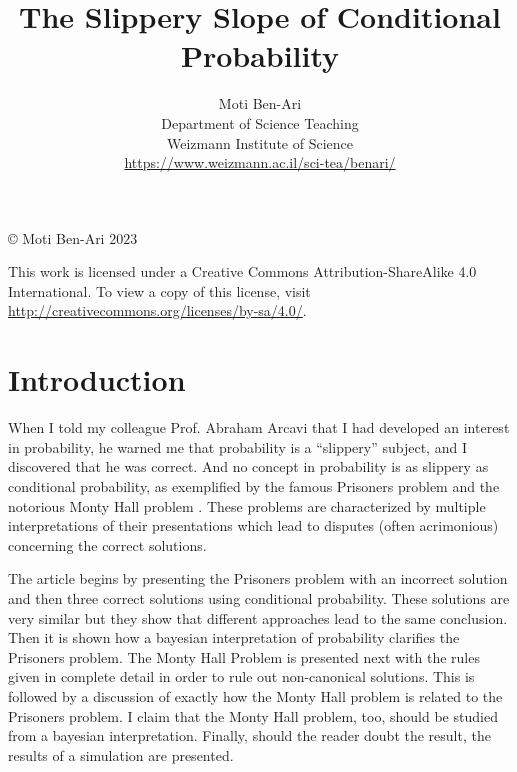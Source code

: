 \documentclass[11pt,a4paper]{article}
\begin{document}
\title{\textbf The Slippery Slope of Conditional Probability}

\author{Moti Ben-Ari\\
Department of Science Teaching\\
Weizmann Institute of Science\\
\url{https://www.weizmann.ac.il/sci-tea/benari/}}

\maketitle

\begin{center}
\footnotesize\copyright{} Moti Ben-Ari $2023$
\end{center}
\vspace*{-3ex}
\begin{footnotesize}
This work is licensed under a Creative Commons Attribution-ShareAlike 4.0 International. To view a copy of this license, visit \url{http://creativecommons.org/licenses/by-sa/4.0/}.
\end{footnotesize}


\section{Introduction}

When I told my colleague Prof. Abraham Arcavi that I had developed an interest in probability, he warned me that probability is a ``slippery'' subject, and I discovered that he was correct. And no concept in probability is as slippery as conditional probability, as exemplified by the famous Prisoners problem and the notorious Monty Hall problem \cite{carlton, fifty, jason, monty, three}. These problems are characterized by multiple interpretations of their presentations which lead to disputes (often acrimonious) concerning the correct solutions.

The article begins by presenting the Prisoners problem with an incorrect solution and then three correct solutions using conditional probability. These solutions are very similar but they show that different approaches lead to the same conclusion. Then it is shown how a bayesian interpretation of probability clarifies the Prisoners problem. The Monty Hall Problem is presented next with the rules given in complete detail in order to rule out non-canonical solutions. This is followed by a discussion of exactly how the Monty Hall problem is related to the Prisoners problem. I claim that the Monty Hall problem, too, should be studied from a bayesian interpretation. Finally, should the reader doubt the result, the results of a simulation are presented.
\end{document}
